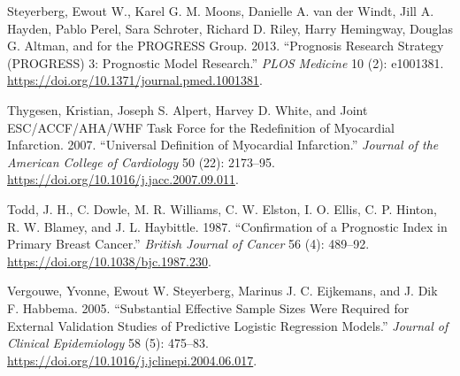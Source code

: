 \documentclass[
]{article}
\newlength{\cslhangindent}
\newenvironment{cslreferences}%
  {\setlength{\parindent}{0pt}%
  \everypar{\setlength{\hangindent}{\cslhangindent}}\ignorespaces}%
  {\par}
\begin{document}
\begin{cslreferences}
\leavevmode\hypertarget{ref-steyerberg_prognosis_2013}{}%
Steyerberg, Ewout W., Karel G. M. Moons, Danielle A. van der Windt, Jill A. Hayden, Pablo Perel, Sara Schroter, Richard D. Riley, Harry Hemingway, Douglas G. Altman, and for the PROGRESS Group. 2013. ``Prognosis Research Strategy (PROGRESS) 3: Prognostic Model Research.'' \emph{PLOS Medicine} 10 (2): e1001381. \url{https://doi.org/10.1371/journal.pmed.1001381}.

\leavevmode\hypertarget{ref-thygesen_universal_2007}{}%
Thygesen, Kristian, Joseph S. Alpert, Harvey D. White, and Joint ESC/ACCF/AHA/WHF Task Force for the Redefinition of Myocardial Infarction. 2007. ``Universal Definition of Myocardial Infarction.'' \emph{Journal of the American College of Cardiology} 50 (22): 2173--95. \url{https://doi.org/10.1016/j.jacc.2007.09.011}.

\leavevmode\hypertarget{ref-todd_confirmation_1987}{}%
Todd, J. H., C. Dowle, M. R. Williams, C. W. Elston, I. O. Ellis, C. P. Hinton, R. W. Blamey, and J. L. Haybittle. 1987. ``Confirmation of a Prognostic Index in Primary Breast Cancer.'' \emph{British Journal of Cancer} 56 (4): 489--92. \url{https://doi.org/10.1038/bjc.1987.230}.

\leavevmode\hypertarget{ref-vergouwe_substantial_2005}{}%
Vergouwe, Yvonne, Ewout W. Steyerberg, Marinus J. C. Eijkemans, and J. Dik F. Habbema. 2005. ``Substantial Effective Sample Sizes Were Required for External Validation Studies of Predictive Logistic Regression Models.'' \emph{Journal of Clinical Epidemiology} 58 (5): 475--83. \url{https://doi.org/10.1016/j.jclinepi.2004.06.017}.
\end{cslreferences}
\end{document}
